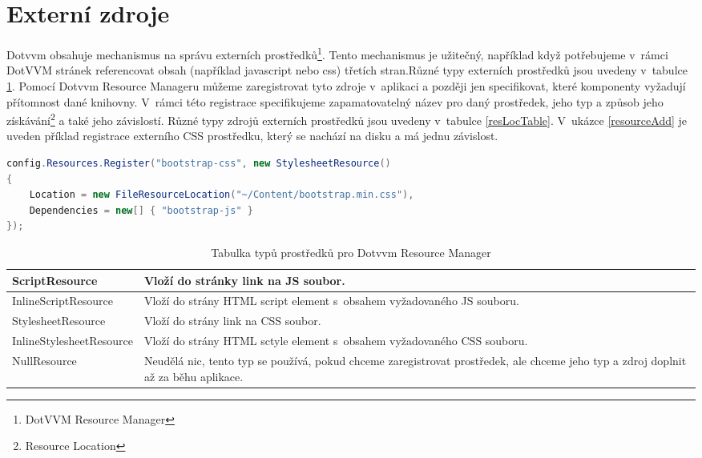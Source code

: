 \section{Externí zdroje}
Dotvvm obsahuje mechanismus na správu externích prostředků\footnote{DotVVM Resource Manager}. Tento mechanismus je užitečný, například když potřebujeme v~rámci DotVVM stránek referencovat obsah (například javascript nebo css) třetích stran.Různé typy externích prostředků jsou uvedeny v~tabulce \ref{resTypeTable}. Pomocí Dotvvm Resource Manageru můžeme zaregistrovat tyto zdroje v~aplikaci a později jen specifikovat, které komponenty vyžadují přítomnost dané knihovny. V~rámci této registrace specifikujeme zapamatovatelný název pro daný prostředek, jeho typ a způsob jeho získávání\footnote{ Resource Location } a také jeho závislostí. Různé typy zdrojů externích prostředků jsou uvedeny v~tabulce \ref{resLocTable}.  V~ukázce \ref{resourceAdd} je uveden příklad registrace externího CSS prostředku, který se nachází na disku a má jednu závislost.
\pagebreak
\begin{lstlisting}[language=c#, caption=Registrace CSS,label=resourceAdd,captionpos=t]
config.Resources.Register("bootstrap-css", new StylesheetResource()
{
    Location = new FileResourceLocation("~/Content/bootstrap.min.css"),
    Dependencies = new[] { "bootstrap-js" }
});
\end{lstlisting}

\begin{table}[H]
	\caption{Tabulka typů prostředků pro Dotvvm Resource Manager}
	\label{resTypeTable}
	\centering
	\begin{tabular}{m{12em}|m{22em}}
		\toprule
ScriptResource           & Vloží do stránky link na JS soubor. \\ \midrule
InlineScriptResource     & Vloží do strány HTML script element s~obsahem vyžadovaného JS souboru. \\ \midrule
StylesheetResource       & Vloží do strány link na CSS soubor. \\ \midrule
InlineStylesheetResource & Vloží do strány HTML sctyle element s~obsahem vyžadovaného CSS souboru. \\ \midrule
NullResource             & Neudělá nic, tento typ se používá, pokud chceme zaregistrovat prostředek, ale chceme jeho typ a zdroj doplnit až za běhu aplikace. \\
\bottomrule
\end{tabular}
\end{table}

